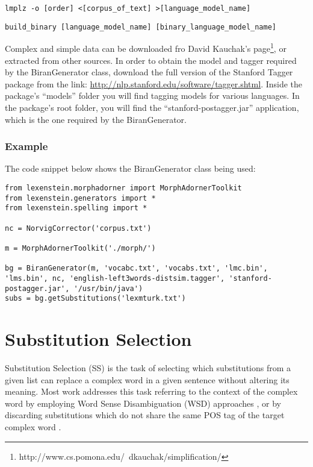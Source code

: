 \begin{lstlisting}
lmplz -o [order] <[corpus_of_text] >[language_model_name]
\end{lstlisting}
\begin{lstlisting}
build_binary [language_model_name] [binary_language_model_name]
\end{lstlisting}

Complex and simple data can be downloaded fro David Kauchak's page\footnote{http://www.cs.pomona.edu/~dkauchak/simplification/}, or extracted from other sources. In order to obtain the model and tagger required by the BiranGenerator class, download the full version of the Stanford Tagger package from the link: \url{http://nlp.stanford.edu/software/tagger.shtml}. Inside the package's ``models'' folder you will find tagging models for various languages. In the package's root folder, you will find the ``stanford-postagger.jar'' application, which is the one required by the BiranGenerator.

\subsubsection{Example}

The code snippet below shows the BiranGenerator class being used:

\begin{lstlisting}
from lexenstein.morphadorner import MorphAdornerToolkit
from lexenstein.generators import *
from lexenstein.spelling import *

nc = NorvigCorrector('corpus.txt')

m = MorphAdornerToolkit('./morph/')

bg = BiranGenerator(m, 'vocabc.txt', 'vocabs.txt', 'lmc.bin', 'lms.bin', nc, 'english-left3words-distsim.tagger', 'stanford-postagger.jar', '/usr/bin/java')
subs = bg.getSubstitutions('lexmturk.txt')
\end{lstlisting}










\section{Substitution Selection}
\label{selectors}

Substitution Selection (SS) is the task of selecting which substitutions from a given list can replace a complex word in a given sentence without altering its meaning. Most work addresses this task referring to the context of the complex word by employing Word Sense Disambiguation (WSD) approaches \cite{Sedding04,Nunes2013}, or by discarding substitutions which do not share the same POS tag of the target complex word \cite{Yamamoto2013,Paetzold2013}.


